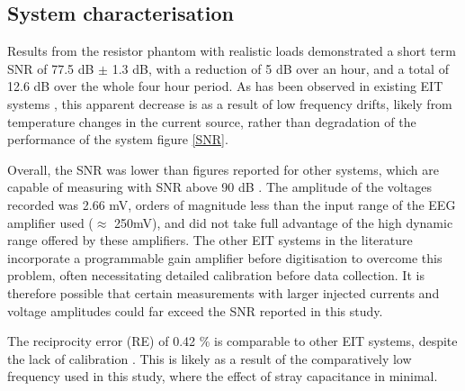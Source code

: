 \subsection{System characterisation}
Results from the resistor phantom with realistic loads demonstrated a short term SNR of 77.5 dB $\pm$ 1.3 dB, with a reduction of 5 dB over an hour, and a total of 12.6 dB over the whole four hour period. As has  been observed in existing EIT systems \cite{oh2007multi}, this apparent decrease is as a result of low frequency drifts, likely from temperature changes in the current source, rather than degradation of the performance of the system figure \ref{SNR}. 

Overall, the SNR was lower than figures reported for other systems, which are capable of measuring with SNR above 90 dB \cite{khan,Hun_Wi_2014}. The amplitude of the voltages recorded was 2.66 mV, orders of magnitude less than the input range of the EEG amplifier used ($\approx$ 250mV), and did not take full advantage of the high dynamic range offered by these amplifiers. The other EIT systems in the literature incorporate a programmable gain amplifier before digitisation to overcome this problem, often necessitating detailed calibration before data collection. It is therefore possible that certain measurements with larger injected currents and voltage amplitudes could far exceed the SNR reported in this study. 

The reciprocity error (RE) of 0.42 \% is comparable to other EIT systems, despite the lack of calibration \cite{oh2007multi,Hun_Wi_2014,khan}. This is likely as a result of the comparatively low frequency used in this study, where the effect of stray capacitance in minimal.  




